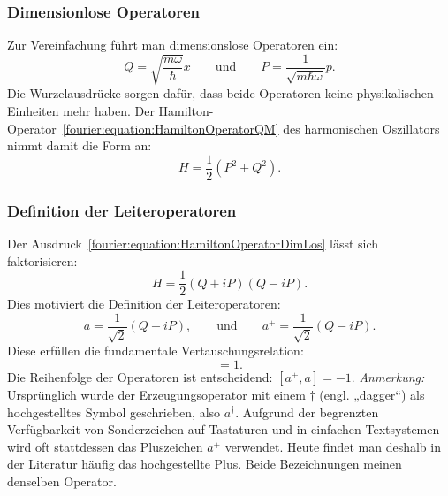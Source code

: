		\subsubsection{Dimensionlose Operatoren\label{fourier:subsubsection:DimensionsloseOperatoren}}
			Zur Vereinfachung führt man dimensionslose Operatoren ein:
			\[
				Q = \sqrt{\frac{m\omega}{\hbar}}x
				\qquad\text{und}\qquad
				P = \frac{1}{\sqrt{m\hbar\omega}}p.
			\]
			Die Wurzelausdrücke sorgen dafür, dass beide Operatoren keine physikalischen Einheiten mehr haben.
			Der Hamilton-Operator~\ref{fourier:equation:HamiltonOperatorQM} des harmonischen Oszillators nimmt damit die Form an:
			\begin{equation}\label{fourier:equation:HamiltonOperatorDimLos}
				H = \frac{1}{2}(P^2 + Q^2).
			\end{equation}

		\subsubsection{Definition der Leiteroperatoren\label{fourier:subsubsection:DefinitionLeiteroperatoren}}
			Der Ausdruck~\ref{fourier:equation:HamiltonOperatorDimLos} lässt sich faktorisieren:
			\[
				H = \frac{1}{2}(Q + iP)(Q - iP).
			\]
			Dies motiviert die Definition der Leiteroperatoren:
			\begin{equation}
				a = \frac{1}{\sqrt{2}}(Q + iP),
				\qquad\text{und}\qquad
				a^+ = \frac{1}{\sqrt{2}}(Q - iP).
			\end{equation}
			Diese erfüllen die fundamentale Vertauschungsrelation:
			\begin{equation}
				[a, a^+] = 1.
			\end{equation}
			Die Reihenfolge der Operatoren ist entscheidend: $[a^+, a] = -1$.
			\textit{Anmerkung:}
			Ursprünglich wurde der Erzeugungsoperator mit einem $\dagger$ (engl. „dagger“) als hochgestelltes Symbol geschrieben, also $a^\dagger$.
			Aufgrund der begrenzten Verfügbarkeit von Sonderzeichen auf Tastaturen und in einfachen Textsystemen wird oft stattdessen das Pluszeichen $a^+$ verwendet.
			Heute findet man deshalb in der Literatur häufig das hochgestellte Plus.
			Beide Bezeichnungen meinen denselben Operator.

